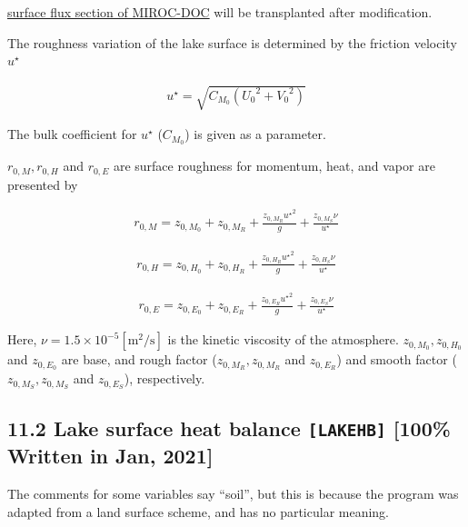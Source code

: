 \href{https://github.com/MIROC-DOC/model_description/blob/surface/draft/p-sfc.md}{surface
flux section of MIROC-DOC} will be transplanted after modification.

The roughness variation of the lake surface is determined by the
friction velocity \(u^\star\)

\begin{eqnarray}
u^{\star} = \sqrt{C_{M_0} ({U_0}^2  +{V_0}^2)}
\end{eqnarray}

The bulk coefficient for \(u^\star\) (\({C_{M_0}}\)) is given as a
parameter.

\(r_{0,M},r_{0,H}\) and \(r_{0,E}\) are surface roughness for momentum,
heat, and vapor are presented by

\begin{eqnarray}
    r_{0,M} = z_{0,M_0} + z_{0,M_R} + \frac{z_{0,M_R} {u^\star }^2 }{g} + \frac{z_{0,M_S}\nu }{u^\star}
\end{eqnarray}

\begin{eqnarray}
    r_{0,H} = z_{0,H_0} + z_{0,H_R} + \frac{z_{0,H_R} {u^\star }^2 }{g} + \frac{z_{0,H_S}\nu }{u^\star}
\end{eqnarray}

\begin{eqnarray}
    r_{0,E} = z_{0,E_0} + z_{0,E_R} + \frac{z_{0,E_R} {u^\star }^2 }{g} + \frac{z_{0,E_S}\nu }{u^\star}
\end{eqnarray}

Here, \(\nu = 1.5 \times 10^{-5} \mathrm{[m^2/s]}\) is the kinetic
viscosity of the atmosphere. \(z_{0,M_0},z_{0,H_0}\) and \(z_{0,E_0}\)
are base, and rough factor (\(z_{0,M_R},z_{0,M_R}\) and \(z_{0,E_R}\))
and smooth factor (\(z_{0,M_S},z_{0,M_S}\) and \(z_{0,E_S}\)),
respectively.

\hypertarget{lake-surface-heat-balance-lakehb-100-written-in-jan-2021}{%
\subsection{\texorpdfstring{11.2 Lake surface heat balance
\texttt{{[}LAKEHB{]}} {[}100\% Written in Jan,
2021{]}}{11.2 Lake surface heat balance {[}LAKEHB{]} {[}100\% Written in Jan, 2021{]}}}\label{lake-surface-heat-balance-lakehb-100-written-in-jan-2021}}

The comments for some variables say ``soil'', but this is because the
program was adapted from a land surface scheme, and has no particular
meaning.

